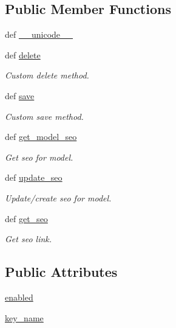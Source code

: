 \subsection*{Public Member Functions}
\begin{DoxyCompactItemize}
\item 
def \hyperlink{classcore_1_1models_1_1Seo_abcdc25916c3a122583536783a570b929}{\-\_\-\-\_\-unicode\-\_\-\-\_\-}
\item 
def \hyperlink{classcore_1_1models_1_1Seo_a34873176512334dc1aadb3eaceff0017}{delete}
\begin{DoxyCompactList}\small\item\em Custom delete method. \end{DoxyCompactList}\item 
def \hyperlink{classcore_1_1models_1_1Seo_a9851406bdaf723e7ad3df70251eafb93}{save}
\begin{DoxyCompactList}\small\item\em Custom save method. \end{DoxyCompactList}\item 
def \hyperlink{classcore_1_1models_1_1Seo_a1eeec2b20f1ef7ff477688c6d954ffd9}{get\-\_\-model\-\_\-seo}
\begin{DoxyCompactList}\small\item\em Get seo for model. \end{DoxyCompactList}\item 
def \hyperlink{classcore_1_1models_1_1Seo_aec1160ede01bc3550806a3b028455289}{update\-\_\-seo}
\begin{DoxyCompactList}\small\item\em Update/create seo for model. \end{DoxyCompactList}\item 
def \hyperlink{classcore_1_1models_1_1Seo_a19d839f4bace8ba7a035fe0a551145e7}{get\-\_\-seo}
\begin{DoxyCompactList}\small\item\em Get seo link. \end{DoxyCompactList}\end{DoxyCompactItemize}
\subsection*{Public Attributes}
\begin{DoxyCompactItemize}
\item 
\hyperlink{classcore_1_1models_1_1Seo_a7c32328ad2bf566ea1902cbe0d9c541c}{enabled}
\item 
\hyperlink{classcore_1_1models_1_1Seo_a644a0f17aaa68dc004c064e4f8be688d}{key\-\_\-name}
\end{DoxyCompactItemize}
